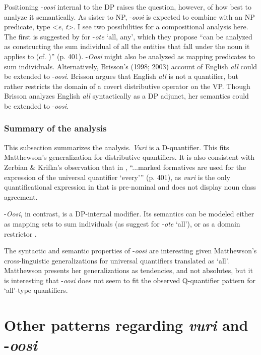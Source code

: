 \documentclass[output=paper]{langsci/langscibook}
\begin{document}
Positioning -\textit{oosi} internal to the DP raises the question, however, of how best to analyze it semantically. As sister to NP, -\textit{oosi} is expected to combine with an NP predicate, type <\textit{e},\textit{ t}>. I see two possibilities for a compositional analysis here. The first is suggested by \citet{ZerbianKrifka2008} for  -\textit{ote} ‘all, any’, which they propose “can be analyzed as constructing the sum individual of all the entities that fall under the noun it applies to (cf. \citealt{Link1983})” (p. 401). -\textit{Oosi} might also be analyzed as mapping predicates to sum individuals. Alternatively, Brisson’s (1998; 2003) account of English \textit{all} could be extended to  -\textit{oosi}. Brisson argues that English \textit{all} is not a quantifier, but rather restricts the domain of a covert distributive operator on the VP. Though Brisson analyzes English \textit{all} syntactically as a DP adjunct, her semantics could be extended to  -\textit{oosi}. 

\subsubsection{Summary of the analysis}

This subsection summarizes the analysis. \textit{Vuri} is a D-quantifier. This fits Matthewson's generalization for distributive quantifiers. It is also consistent with Zerbian \& Krifka's observation that in , “...marked formatives are used for the expression of the universal quantifier `every'” (p. 401), as \textit{vuri} is the only quantificational expression in  that is pre-nominal and does not display noun class agreement. 

-\textit{Oosi}, in contrast, is a DP-internal modifier. Its semantics can be modeled either as mapping sets to sum individuals (as \citealt{ZerbianKrifka2008} suggest for  -\textit{ote} ‘all’), or as a domain restrictor \citep{Brisson1998,Brisson2003}. 

The syntactic and semantic properties of -\textit{oosi} are interesting given Matthewson's cross-linguistic generalizations for universal quantifiers translated as ‘all’. Matthewson presents her generalizations as tendencies, and not absolutes, but it is interesting that -\textit{oosi} does not seem to fit the observed Q-quantifier pattern for ‘all’-type quantifiers. 

\section{Other patterns regarding \textit{vuri} and -\textit{oosi}}\label{sec:landman:4}
\end{document}
